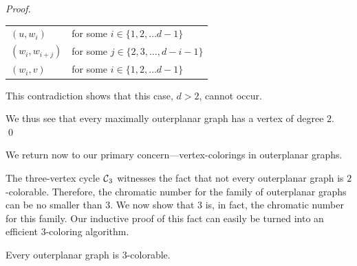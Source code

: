 \begin{proof}
\begin{enumerate}
\hspace*{.2in}\begin{tabular}{ll}
$(u, w_i)$
 & for some $i \in \{1, 2, \ldots d-1\}$ \\ 
$(w_i, w_{i+j})$
 & for some $j \in \{ 2, 3, \ldots, d-i-1\}$ \\
$(w_i, v)$
 & for some $i \in \{1, 2, \ldots d-1\}$
\end{tabular}

\smallskip

This contradiction shows that this case, $d>2$, cannot occur.
\end{enumerate}
We thus see that every maximally outerplanar graph has a vertex of degree $2$.  \qed
\end{proof}

\medskip

We return now to our primary concern---vertex-colorings in outerplanar graphs.

\medskip

The three-vertex cycle $\mbox{$\cal C$}_3$ witnesses the fact that not every outerplanar graph is $2$-colorable. Therefore, the chromatic number for the family of outerplanar graphs can be no smaller than $3$.  We now show that $3$ is, in fact, the chromatic number for this family.  Our inductive proof of this fact can easily be turned into an efficient $3$-coloring algorithm.

\begin{prop}
\label{thm:OP-3-colorability}
Every outerplanar graph is $3$-colorable.
\end{prop}

